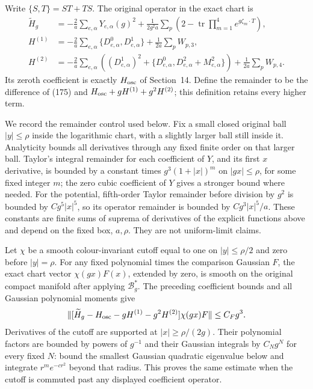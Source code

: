 \documentclass[11pt]{article}
\newcommand{\tr}{\operatorname{tr}}
\begin{document}
Write $\{S,T\}=ST+TS$. The original operator in the exact chart is
\begin{align}
 \widetilde H_g&=-\frac2a\sum_{e,\alpha}Y_{e,\alpha}(g)^2
       +\frac1{2g^2a}\sum_p
                      \left(2-\tr\prod_{m=1}^4e^{g\zeta_m\cdot T}\right),
       \label{eq:vertex-full-H}\\
 H^{(1)}&=-\frac2a\sum_{e,\alpha}\{D^0_{e,\alpha},D^1_{e,\alpha}\}
                           +\frac1{2a}\sum_pW_{p,3},\nonumber\\
 H^{(2)}&=-\frac2a\sum_{e,\alpha}
       \left((D^1_{e,\alpha})^2+
             \{D^0_{e,\alpha},D^2_{e,\alpha}+M^2_{e,\alpha}\}\right)
                           +\frac1{2a}\sum_pW_{p,4}.
       \label{eq:vertex-H12}
\end{align}
Its zeroth coefficient is exactly $H_{\rm osc}$ of Section~14.
Define the remainder to be the difference of
(175) and $H_{\rm osc}+gH^{(1)}+g^2H^{(2)}$;
this definition retains every higher term.

We record the remainder control used below. Fix a small closed original
ball $|y|\le\rho$ inside the logarithmic chart, with a slightly larger
ball still inside it. Analyticity bounds all derivatives through any
fixed finite order on that larger ball. Taylor's integral remainder
for each coefficient of $Y$, and its first $x$ derivative, is bounded
by a constant times $g^3(1+|x|)^m$ on $|gx|\le\rho$, for some
fixed integer $m$; the zero cubic coefficient of $Y$ gives a stronger
bound where needed. For the potential, fifth-order Taylor remainder
before division by $g^2$ is bounded by $C g^5|x|^5$, so its operator
remainder is bounded by $C g^3|x|^5/a$. These constants are finite
sums of suprema of derivatives of the explicit functions above and
depend on the fixed box, $a,\rho$. They are not uniform-limit claims.

Let $\chi$ be a smooth colour-invariant cutoff equal to one on
$|y|\le\rho/2$ and zero before $|y|=\rho$. For any fixed polynomial
times the comparison Gaussian $F$, the exact chart vector
$\chi(gx)F(x)$, extended by zero, is smooth on the original compact
manifold after applying $\mathcal B_g^*$. The preceding coefficient
bounds and all Gaussian polynomial moments give
\begin{equation}\label{eq:vertex-remainder-bound}
 \|[\widetilde H_g-H_{\rm osc}-gH^{(1)}-g^2H^{(2)}]
                       \chi(gx)F\|\le C_F g^3.
\end{equation}
Derivatives of the cutoff are supported at $|x|\ge\rho/(2g)$.
Their polynomial factors are bounded by powers of $g^{-1}$ and
their Gaussian integrals by $C_Ng^N$ for every fixed $N$: bound
the smallest Gaussian quadratic eigenvalue below and integrate
$r^m e^{-cr^2}$ beyond that radius. This proves the same estimate
when the cutoff is commuted past any displayed coefficient operator.
\end{document}
